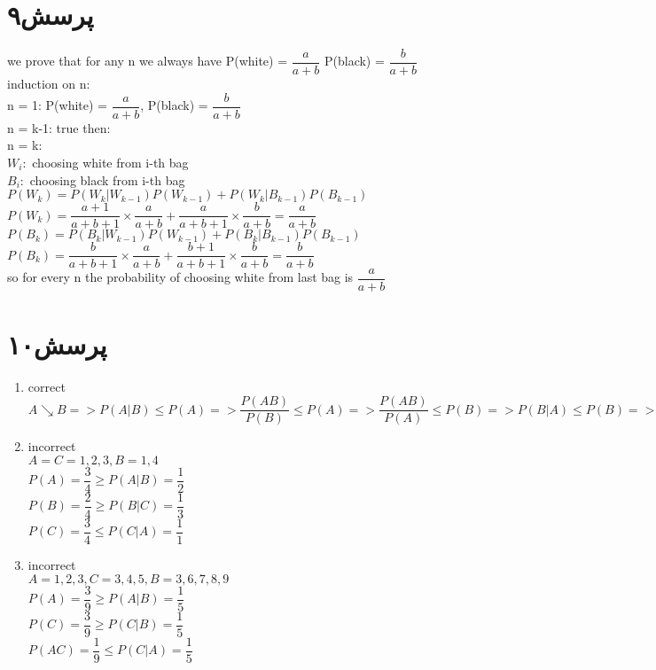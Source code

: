 \documentclass[a4paper]{article}
\begin{document}
\section*{پرسش۹}
\begin{latin}
we prove that for any n we always have P(white) = $\dfrac{a}{a+b}$ P(black) = $ \dfrac{b}{a+b}$\\
induction on n:\\
n = 1: P(white) = $\dfrac{a}{a+b}$, P(black) = $\dfrac{b}{a+b}$\\
n = k-1: true then:\\
n = k: \\
$W_i: $ choosing white from i-th bag\\
$B_i: $ choosing black from i-th bag\\
$P(W_k) = P(W_k|W_{k-1}) P(W_{k-1}) + P(W_k|B_{k-1}) P(B_{k-1})$\\
$P(W_k) = \dfrac{a+1}{a+b+1} \times \dfrac{a}{a+b} + \dfrac{a}{a+b+1} \times \dfrac{b}{a+b} = \dfrac{a}{a+b} $\\

$P(B_k) = P(B_k|W_{k-1}) P(W_{k-1}) + P(B_k|B_{k-1}) P(B_{k-1})$\\
$P(B_k) = \dfrac{b}{a+b+1} \times \dfrac{a}{a+b} + \dfrac{b+1}{a+b+1} \times \dfrac{b}{a+b} = \dfrac{b}{a+b} $\\

so for every n the probability of choosing white from last bag is $ \dfrac{a}{a+b} $

\end{latin}

\pagebreak
\section*{پرسش۱۰}
\begin{latin}
\begin{enumerate}
\item{}
correct \\
$ A \searrow B => P(A|B) \leq P(A) => \dfrac{P(AB)}{P(B)} \leq P(A) => \dfrac{P(AB)}{P(A)} \leq P(B) => P(B|A) \leq P(B) => B \searrow A $
\item{}
incorrect\\
$ A = C = {1,2,3}, B = {1,4}$\\
$ P(A) = \dfrac{3}{4} \geq P(A|B) = \dfrac{1}{2}  $\\
$ P(B) = \dfrac{2}{4} \geq P(B|C) = \dfrac{1}{3}  $\\
$ P(C) = \dfrac{3}{4} \leq P(C|A) = \dfrac{1}{1}  $\\
\item{}
incorrect\\
$ A = {1,2,3},  C = {3,4,5}, B = {3,6,7,8,9}$\\
$ P(A) = \dfrac{3}{9} \geq P(A|B) = \dfrac{1}{5}  $\\
$ P(C) = \dfrac{3}{9} \geq P(C|B) = \dfrac{1}{5}  $\\
$ P(AC) = \dfrac{1}{9} \leq P(C|A) = \dfrac{1}{5}  $\\

\end{enumerate}
\end{latin}
\end{document}
